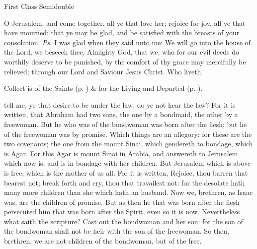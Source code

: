 \begin{inhead}
{First Class Semidouble}
\end{inhead}

\properantiphonfix

\introit
{} O Jerusalem, and come together, all ye that love her; rejoice for joy, all ye that have mourned: that ye may be glad, and be satisfied with the breasts of your consolation. \textit{Ps.} I was glad when they said unto me: We will go into the house of the Lord.
\collect
{} we beseech thee, Almighty God, that we, who for our evil deeds do worthily deserve to be punished, by the comfort of thy grace may mercifully be relieved; through our Lord and Saviour Jesus Christ. Who liveth.
\begin{rubric}
     Collect is of the Saints (p. \pageref{SPSaints}) \&  for the Living and Departed (p. \pageref{SPLivingDeparted}).
\end{rubric}
 tell me, ye that desire to be under the law, do ye not hear the law? For it is written, that Abraham had two sons, the one by a bondmaid, the other by a freewoman. But he who was of the bondwoman was born after the flesh; but he of the freewoman was by promise. Which things are an allegory: for these are the two covenants; the one from the mount Sinai, which gendereth to bondage, which is Agar. For this Agar is mount Sinai in Arabia, and answereth to Jerusalem which now is, and is in bondage with her children. But Jerusalem which is above is free, which is the mother of us all. For it is written, Rejoice, thou barren that bearest not; break forth and cry, thou that travailest not: for the desolate hath many more children than she which hath an husband. Now we, brethren, as Isaac was, are the children of promise. But as then he that was born after the flesh persecuted him that was born after the Spirit, even so it is now. Nevertheless what saith the scripture? Cast out the bondwoman and her son: for the son of the bondwoman shall not be heir with the son of the freewoman. So then, brethren, we are not children of the bondwoman, but of the free.


